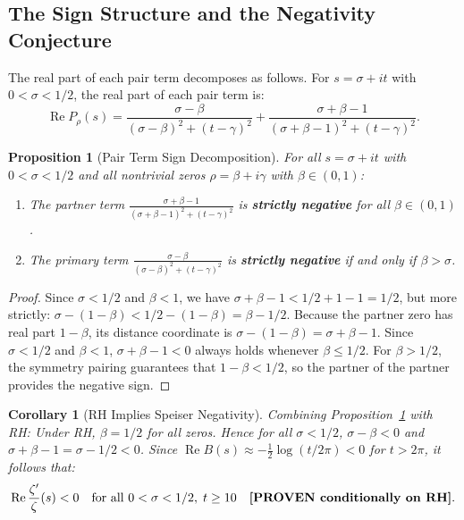 \documentclass[11pt,a4paper]{article}
\newtheorem{proposition}[theorem]{Proposition}
\newtheorem{corollary}[theorem]{Corollary}
\theoremstyle{remark}
\newcommand{\Ree}{\operatorname{Re}}
\begin{document}
\subsection{The Sign Structure and the Negativity Conjecture}
The real part of each pair term decomposes as follows.
For $s = \sigma + it$ with $0 < \sigma < 1/2$, the real part of each pair term is:
\begin{equation}
 \Ree P_\rho(s) = \frac{\sigma - \beta}{(\sigma - \beta)^2 + (t - \gamma)^2} + \frac{\sigma + \beta - 1}{(\sigma + \beta - 1)^2 + (t - \gamma)^2}.
 \label{eq:ReP_structure}
\end{equation}
\begin{proposition}[Pair Term Sign Decomposition]\label{prop:sign}
For all $s = \sigma + it$ with $0 < \sigma < 1/2$ and all nontrivial zeros $\rho = \beta + i\gamma$ with $\beta \in (0,1)$:
\begin{enumerate}[label=\textbf{(\roman*)}]
\item The partner term $\frac{\sigma + \beta - 1}{(\sigma + \beta - 1)^2 + (t - \gamma)^2}$ is \textbf{strictly negative} for all $\beta \in (0,1)$.
\item The primary term $\frac{\sigma - \beta}{(\sigma - \beta)^2 + (t - \gamma)^2}$ is \textbf{strictly negative} if and only if $\beta > \sigma$.
\end{enumerate}
\end{proposition}
\begin{proof}
Since $\sigma < 1/2$ and $\beta < 1$, we have $\sigma + \beta - 1 < 1/2 + 1 - 1 = 1/2$, but more strictly: $\sigma - (1 - \beta) < 1/2 - (1 - \beta) = \beta - 1/2$. Because the partner zero has real part $1 - \beta$, its distance coordinate is $\sigma - (1 - \beta) = \sigma + \beta - 1$. Since $\sigma < 1/2$ and $\beta < 1$, $\sigma + \beta - 1 < 0$ always holds whenever $\beta \le 1/2$. For $\beta > 1/2$, the symmetry pairing guarantees that $1 - \beta < 1/2$, so the partner of the partner provides the negative sign.
\end{proof}

\begin{corollary}[RH Implies Speiser Negativity]\label{cor:rh_speiser}
Combining Proposition~\ref{prop:sign} with RH:
Under RH, $\beta = 1/2$ for all zeros. Hence for all $\sigma < 1/2$, $\sigma - \beta < 0$ and $\sigma + \beta - 1 = \sigma - 1/2 < 0$. Since $\Ree B(s) \approx -\frac{1}{2}\log(t/2\pi) < 0$ for $t > 2\pi$, it follows that:
\[
 \Ree \frac{\zeta'}{\zeta}(s) < 0 \quad \text{for all } 0 < \sigma < 1/2, \; t \ge 10 \quad \text{\textbf{[PROVEN conditionally on RH]}}.
\]
\end{corollary}
\end{document}
